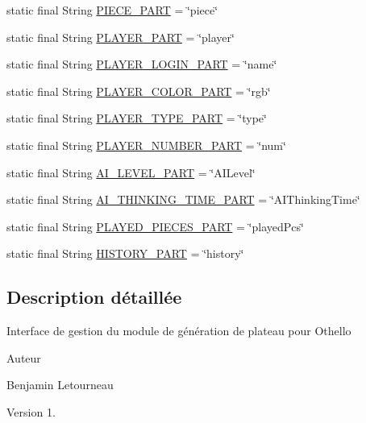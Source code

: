 \begin{DoxyCompactItemize}
static final String \hyperlink{interfacecom_1_1publisher_1_1BoardPublisher_a9f510b47f92ce1a0a4f716f63af1a226}{P\-I\-E\-C\-E\-\_\-\-P\-A\-R\-T} = \char`\"{}piece\char`\"{}
\item 
static final String \hyperlink{interfacecom_1_1publisher_1_1BoardPublisher_abbeefc71cd90ad0fec6ff50ab5cf2844}{P\-L\-A\-Y\-E\-R\-\_\-\-P\-A\-R\-T} = \char`\"{}player\char`\"{}
\item 
static final String \hyperlink{interfacecom_1_1publisher_1_1BoardPublisher_a2d0128b35b0dd2fd6e39c72600db5e5e}{P\-L\-A\-Y\-E\-R\-\_\-\-L\-O\-G\-I\-N\-\_\-\-P\-A\-R\-T} = \char`\"{}name\char`\"{}
\item 
static final String \hyperlink{interfacecom_1_1publisher_1_1BoardPublisher_a19fc43fcd0518ae4fda36b0ae8f5a5b5}{P\-L\-A\-Y\-E\-R\-\_\-\-C\-O\-L\-O\-R\-\_\-\-P\-A\-R\-T} = \char`\"{}rgb\char`\"{}
\item 
static final String \hyperlink{interfacecom_1_1publisher_1_1BoardPublisher_a46cc4c07629b28cb80562eb26e6ba203}{P\-L\-A\-Y\-E\-R\-\_\-\-T\-Y\-P\-E\-\_\-\-P\-A\-R\-T} = \char`\"{}type\char`\"{}
\item 
static final String \hyperlink{interfacecom_1_1publisher_1_1BoardPublisher_ada5e40ef43bea9a32144b7772ff68882}{P\-L\-A\-Y\-E\-R\-\_\-\-N\-U\-M\-B\-E\-R\-\_\-\-P\-A\-R\-T} = \char`\"{}num\char`\"{}
\item 
static final String \hyperlink{interfacecom_1_1publisher_1_1BoardPublisher_aae576f06d1b439ecdc67cf86b0a3ac00}{A\-I\-\_\-\-L\-E\-V\-E\-L\-\_\-\-P\-A\-R\-T} = \char`\"{}A\-I\-Level\char`\"{}
\item 
static final String \hyperlink{interfacecom_1_1publisher_1_1BoardPublisher_a70adf8b9c4d2855f48d1f8ba6e791dc4}{A\-I\-\_\-\-T\-H\-I\-N\-K\-I\-N\-G\-\_\-\-T\-I\-M\-E\-\_\-\-P\-A\-R\-T} = \char`\"{}A\-I\-Thinking\-Time\char`\"{}
\item 
static final String \hyperlink{interfacecom_1_1publisher_1_1BoardPublisher_a79a3b42afcb9fba37f70796768497b8c}{P\-L\-A\-Y\-E\-D\-\_\-\-P\-I\-E\-C\-E\-S\-\_\-\-P\-A\-R\-T} = \char`\"{}played\-Pcs\char`\"{}
\item 
static final String \hyperlink{interfacecom_1_1publisher_1_1BoardPublisher_a748ec30f1f7c5b9df00b87395e68804b}{H\-I\-S\-T\-O\-R\-Y\-\_\-\-P\-A\-R\-T} = \char`\"{}history\char`\"{}
\end{DoxyCompactItemize}


\subsection{Description détaillée}
Interface de gestion du module de génération de plateau pour Othello \begin{DoxyAuthor}{Auteur}

\begin{DoxyItemize}
\item Benjamin Letourneau
\end{DoxyItemize}
\end{DoxyAuthor}
\begin{DoxyVersion}{Version}
1. 
\end{DoxyVersion}


